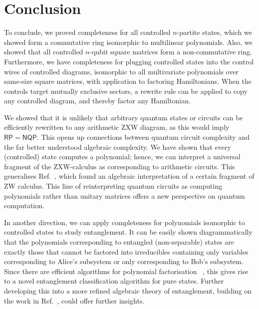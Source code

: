 \section{Conclusion}
To conclude, we proved completeness for all controlled $n$-partite states, which we showed form a commutative ring isomorphic to multilinear polynomials. Also, we showed that all controlled $n$-qubit square matrices form a non-commutative ring. Furthermore, we have completeness for plugging controlled states into the control wires of controlled diagrams, isomorphic to all multivariate polynomials over same-size square matrices, with application to factoring Hamiltonians. When the controls target mutually exclusive sectors, a rewrite rule can be applied to copy any controlled diagram, and thereby factor any Hamiltonian.

We showed that it is unlikely that arbitrary quantum states or circuits can be efficiently rewritten to any arithmetic ZXW diagram, as this would imply $\mathsf{RP} = \mathsf{NQP}$.
This opens up connections between quantum circuit complexity and the far better understood algebraic complexity.
We have shown that every (controlled) state computes a polynomial; hence, we can interpret a universal fragment of the ZXW-calculus as corresponding to arithmetic circuits. This generalises Ref.~\cite{carette2023compositionality}, which found an algebraic interpretation of a certain fragment of ZW calculus.
This line of reinterpreting quantum circuits as computing polynomials rather than unitary matrices offers a new perspective on quantum computation.

In another direction, we can apply completeness for polynomials isomorphic to controlled states to study entanglement. It can be easily shown diagrammatically that the polynomials corresponding to entangled (non-separable) states are exactly those that cannot be factored into irreducibles containing only variables corresponding to Alice's subsystem or only corresponding to Bob's subsystem. Since there are efficient algorithms for polynomial factorisation ~\cite{forbes2015complexity}, this gives rise to a novel entanglement classification algorithm for pure states. Further developing this into a more refined algebraic theory of entanglement, building on the work in Ref.~\cite{Agnew2023Masters}, could offer further insights.

